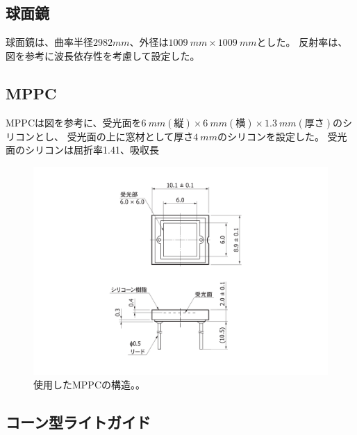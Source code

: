 \subsection{球面鏡}
球面鏡は、曲率半径$2982 \si{mm}$、外径は$\SI{1009}{mm}\times\SI{1009}{mm}$とした。
反射率は、図を参考に波長依存性を考慮して設定した。




\subsection{MPPC}
MPPCは図を参考に、受光面を$\SI{6}{mm}(縦)\times\SI{6}{mm}(横)\times\SI{1.3}{mm}(厚さ)$のシリコンとし、
受光面の上に窓材として厚さ$\SI{4}{mm}$のシリコンを設定した。
受光面のシリコンは屈折率1.41、吸収長
\begin{figure}
  \centering
  \includegraphics[width=15cm]{images/chapter4/MPPCshape.pdf}
  \caption{使用したMPPCの構造。。}
  \label{fig:MPPCshape}
\end{figure}

\subsection{コーン型ライトガイド}



